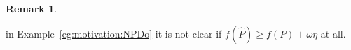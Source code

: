 \documentclass[11pt]{article}
\def\wtd{\widetilde}
\def\what{\widehat}
\newcommand\STM[2]{{\rm St}(#1,#2)}
\DeclareMathOperator{\tr}{tr}
\DeclareMathOperator{\T}{T}
\def\Blue{\textcolor{blue}}
\theoremstyle{definition}
\newtheorem{remark}{Remark}[section]
\numberwithin{equation}{section}
\begin{document}
\begin{remark}
\begin{enumerate}[(i)]
        in Example~\ref{eg:motivation:NPDo} it is not clear if $f(\what P)\ge f(P)+\omega\eta$ at all.
\end{enumerate}
\end{remark}
\end{document}
